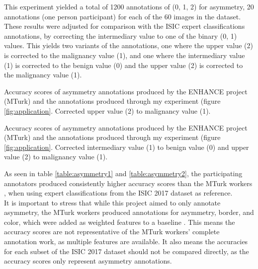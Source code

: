 \documentclass[../report.tex]{subfiles}
\begin{document}
This experiment yielded a total of 1200 annotations of (0, 1, 2) for asymmetry, 20 annotations (one person participant) for each of the 60 images in the dataset. These results were adjusted for comparison with the ISIC expert classifications \cite{ISIC2017Challenge} annotations, by correcting the intermediary value to one of the binary (0, 1) values. This yields two variants of the annotations, one where the upper value (2) is corrected to the malignancy value (1), and one where the intermediary value (1) is corrected to the benign value (0) and the upper value (2) is corrected to the malignancy value (1). \\

\begin{table}[h!]
\centering
{}
\caption{Accuracy scores of asymmetry annotations produced by the ENHANCE project (MTurk) \cite{Ralf2021ENHANCE} and the annotations produced through my experiment (figure \ref{fig:application}. Corrected upper value (2) to malignancy value (1).}
\label{table:asymmetry1}
\end{table}

\begin{table}[h!]
\centering
{}
\caption{Accuracy scores of asymmetry annotations produced by the ENHANCE project (MTurk) \cite{Ralf2021ENHANCE} and the annotations produced through my experiment (figure \ref{fig:application}. Corrected intermediary value (1) to benign value (0) and upper value (2) to malignancy value (1).}
\label{table:asymmetry2}
\end{table}

As seen in table \ref{table:asymmetry1} and \ref{table:asymmetry2}, the participating annotators produced consistently higher accuracy scores than the MTurk workers \cite{Ralf2021ENHANCE}, when using expert classifications from the ISIC 2017 dataset \cite{ISIC2017Challenge} as reference. \\

It is important to stress that while this project aimed to only annotate asymmetry, the MTurk workers produced annotations for asymmetry, border, and color, which were added as weighted features to a baseline \cite{Ralf2021ENHANCE}. This means the accuracy scores are not representative of the MTurk workers' complete annotation work, as multiple features are available. It also means the accuracies for each subset of the ISIC 2017 dataset \cite{ISIC2017Challenge} should not be compared directly, as the accuracy scores only represent asymmetry annotations.
\end{document}
